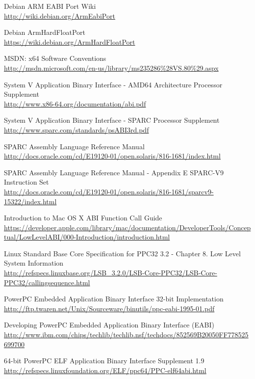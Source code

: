 \begin{thebibliography}{99}
	Debian ARM EABI Port Wiki\\
	\url{http://wiki.debian.org/ArmEabiPort}

	Debian ArmHardFloatPort\\
	\url{https://wiki.debian.org/ArmHardFloatPort}

	MSDN: x64 Software Conventions\\
	\url{http://msdn.microsoft.com/en-us/library/ms235286\%28VS.80\%29.aspx}

	System V Application Binary Interface - AMD64 Architecture Processor Supplement\\
	\url{http://www.x86-64.org/documentation/abi.pdf}

	System V Application Binary Interface - SPARC Processor Supplement\\
	\url{http://www.sparc.com/standards/psABI3rd.pdf}

	SPARC Assembly Language Reference Manual\\
	\url{http://docs.oracle.com/cd/E19120-01/open.solaris/816-1681/index.html}

	SPARC Assembly Language Reference Manual - Appendix E SPARC-V9 Instruction Set\\
	\url{http://docs.oracle.com/cd/E19120-01/open.solaris/816-1681/sparcv9-15322/index.html}

	Introduction to Mac OS X ABI Function Call Guide\\
	\url{https://developer.apple.com/library/mac/documentation/DeveloperTools/Conceptual/LowLevelABI/000-Introduction/introduction.html}

	Linux Standard Base Core Specification for PPC32 3.2 - Chapter 8. Low Level System Information\\
	\url{http://refspecs.linuxbase.org/LSB\_3.2.0/LSB-Core-PPC32/LSB-Core-PPC32/callingsequence.html}

	PowerPC Embedded Application Binary Interface 32-bit Implementation\\
	\url{http://ftp.twaren.net/Unix/Sourceware/binutils/ppc-eabi-1995-01.pdf}

	Developing PowerPC Embedded Application Binary Interface (EABI)\\
	\url{http://www.ibm.com/chips/techlib/techlib.nsf/techdocs/852569B20050FF778525699700}

	64-bit PowerPC ELF Application Binary Interface Supplement 1.9\\
	\url{http://refspecs.linuxfoundation.org/ELF/ppc64/PPC-elf64abi.html}


\end{thebibliography}
